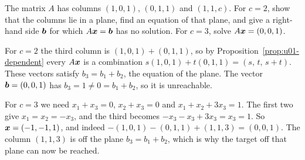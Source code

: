 \begin{exercise}\label{ex:u01-param}
The matrix $A$ has columns $(1,0,1)$, $(0,1,1)$ and $(1,1,c)$. For $c=2$, show that the
columns lie in a plane, find an equation of that plane, and give a right-hand side $\boldsymbol{b}$
for which $A\boldsymbol{x}=\boldsymbol{b}$ has no solution. For $c=3$, solve $A\boldsymbol{x}=(0,0,1)$.
\end{exercise}
\begin{solution}
For $c=2$ the third column is $(1,0,1)+(0,1,1)$, so by
Proposition~\ref{prop:u01-dependent} every $A\boldsymbol{x}$ is a combination
$s(1,0,1)+t(0,1,1)=(s,\,t,\,s+t)$. These vectors satisfy $b_3=b_1+b_2$, the equation of
the plane. The vector $\boldsymbol{b}=(0,0,1)$ has $b_3=1\neq0=b_1+b_2$, so it is unreachable.

For $c=3$ we need $x_1+x_3=0$, $x_2+x_3=0$ and $x_1+x_2+3x_3=1$. The first two give
$x_1=x_2=-x_3$, and the third becomes $-x_3-x_3+3x_3=x_3=1$. So $\boldsymbol{x}=(-1,-1,1)$, and
indeed $-(1,0,1)-(0,1,1)+(1,1,3)=(0,0,1)$. The column $(1,1,3)$ is off the plane
$b_3=b_1+b_2$, which is why the target off that plane can now be reached.
\end{solution}
